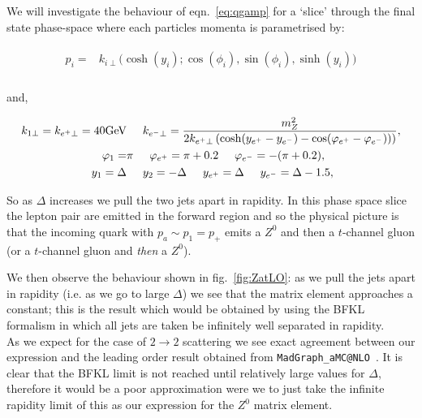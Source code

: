 		We will investigate the behaviour of eqn.~\eqref{eq:qgamp} for a `slice' through the final state phase-space
		where each particles momenta is parametrised by:

		\begin{align*}
		\begin{split}
			p_i = &k_{i\perp}\Big(\cosh (y_i); \cos (\phi_i), \sin (\phi_i), \sinh (y_i)\Big) \\
		\end{split}
		\end{align*}

		and,

		\begin{align}
		\begin{split}
			k_{1\perp} = k_{e^+\perp} = 40\mbox{GeV}& \hspace{0.5cm} k_{e^-\perp} =
			\frac{m_Z^2}{2k_{e^+\perp}\left(\cosh(y_{e^+} - y_{e^-}) -
			    \cos(\varphi_{e^+} - \varphi_{e^-}))\right)}, \\
			\varphi_{1} =& \pi \hspace{0.5cm} \varphi_{e^+} = \pi + 0.2 \hspace{0.5cm}
			\varphi_{e^-} = -(\pi + 0.2), \\
			y_1=\Delta& \hspace{0.5cm} y_2=-\Delta \hspace{0.5cm} y_{e^+} = \Delta
			\hspace{0.5cm} y_{e^-} = \Delta - 1.5,
			\label{eq:momenta}
		\end{split}
		\end{align}

		So as $\Delta$ increases we pull the two jets apart in rapidity.  In this phase space slice
		the lepton pair are emitted in the forward region and so the physical picture is that the
		incoming quark with $p_a\sim p_1=p_+$ emits a $Z^0$ and then a $t$-channel gluon (or a
		$t$-channel gluon and \emph{then} a $Z^0$).

		We then observe the behaviour shown in fig.~\eqref{fig:ZatLO}: as we pull the
		jets apart in rapidity (i.e. as we go to large $\Delta$) we see that the matrix element
		approaches a constant; this is the result which would be obtained by using the BFKL
		formalism in which all jets are taken be infinitely well separated in rapidity.\\As we
		expect for the case of $2\to 2$ scattering we see exact agreement between our expression
		and the leading order result obtained from \texttt{MadGraph\_aMC@NLO}~\cite{Alwall:2014hca}.
		It is clear that the BFKL limit is not reached until relatively large values for $\Delta$,
		therefore it would be a poor approximation were we to just take the infinite rapidity limit
		of this as our expression for the $Z^0$ matrix element.

